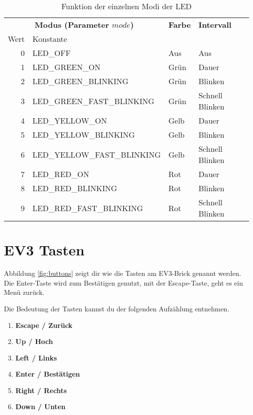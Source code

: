 		\begin{table}[htbp]
		\caption{Funktion der einzelnen Modi der LED}
		\begin{center}
		\begin{tabular}{r|l|l|l}
		
		\multicolumn{2}{c|}{\textbf{Modus (Parameter $mode$)}}   & \textbf{Farbe} & \textbf{Intervall} \\ 
		\multicolumn{1}{l|}{Wert} & Konstante &  &  \\ \hline
		0 & LED\_OFF & Aus & Aus \\ 
		1 & LED\_GREEN\_ON & Grün & Dauer \\ 
		2 & LED\_GREEN\_BLINKING & Grün & Blinken \\ 
		3 & LED\_GREEN\_FAST\_BLINKING & Grün & Schnell Blinken \\ 
		4 & LED\_YELLOW\_ON & Gelb & Dauer \\ 
		5 & LED\_YELLOW\_BLINKING & Gelb & Blinken \\ 
		6 & LED\_YELLOW\_FAST\_BLINKING & Gelb & Schnell Blinken \\ 
		7 & LED\_RED\_ON & Rot & Dauer \\ 
		8 & LED\_RED\_BLINKING & Rot & Blinken \\ 
		9 & LED\_RED\_FAST\_BLINKING & Rot & Schnell Blinken \\ 
		\end{tabular}
		\end{center}
		\label{tab:led}
		\end{table}
		
		\newpage
		\section{EV3 Tasten}
		Abbildung \ref{fig:buttons} zeigt dir wie die Tasten am EV3-Brick genannt werden. Die Enter-Taste wird zum Bestätigen genutzt, mit der Escape-Taste, geht es ein Menü zurück. 
		
		Die Bedeutung der Tasten kannst du der folgenden Aufzählung entnehmen. 
		\begin{enumerate}
			\item \textbf{Escape / Zurück}
			\item \textbf{Up / Hoch}
			\item \textbf{Left / Links}
			\item \textbf{Enter / Bestätigen}
			\item \textbf{Right / Rechts}  
			\item \textbf{Down / Unten}  
		\end{enumerate}
	
